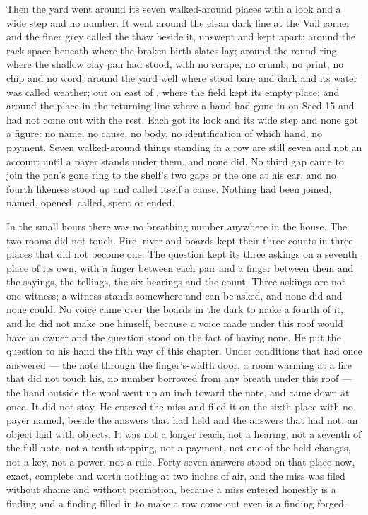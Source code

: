 Then the yard went around its seven walked-around places with a look and a wide step and no number. It went around the clean dark line at the Vail corner and the finer grey called the thaw beside it, unswept and kept apart; around the rack space beneath  where the broken birth-slates lay; around the round ring where the shallow clay pan had stood, with no scrape, no crumb, no print, no chip and no word; around the yard well where  stood bare and dark and its water was called weather; out on  east of , where the field kept its empty place; and around the place in the returning line where a hand had gone in on Seed 15 and had not come out with the rest. Each got its look and its wide step and none got a figure: no name, no cause, no body, no identification of which hand, no payment. Seven walked-around things standing in a row are still seven and not an account until a payer stands under them, and none did. No third gap came to join the pan's gone ring to the shelf's two gaps or the one at his ear, and no fourth likeness stood up and called itself a cause. Nothing had been joined, named, opened, called, spent or ended.

\scenebreak

In the small hours there was no breathing number anywhere in the house. The two rooms did not touch. Fire, river and boards kept their three counts in three places that did not become one. The question kept its three askings on a seventh place of its own, with a finger between each pair and a finger between them and the sayings, the tellings, the six hearings and the count. Three askings are not one witness; a witness stands somewhere and can be asked, and none did and none could. No voice came over the boards in the dark to make a fourth of it, and he did not make one himself, because a voice made under this roof would have an owner and the question stood on the fact of having none. He put the question to his hand the fifth way of this chapter. Under conditions that had once answered --- the note through the finger's-width door, a room warming at a fire that did not touch his, no number borrowed from any breath under this roof --- the hand outside the wool went up an inch toward the note, and came down at once. It did not stay. He entered the miss and filed it on the sixth place with no payer named, beside the answers that had held and the answers that had not, an object laid with objects. It was not a longer reach, not a hearing, not a seventh of the full note, not a tenth stopping, not a payment, not one of the held changes, not a key, not a power, not a rule. Forty-seven answers stood on that place now, exact, complete and worth nothing at two inches of air, and the miss was filed without shame and without promotion, because a miss entered honestly is a finding and a finding filled in to make a row come out even is a finding forged.

